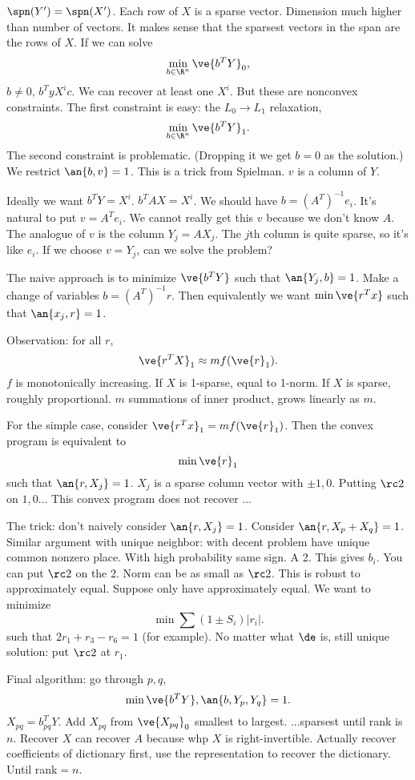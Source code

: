 $\spn(Y')=\spn(X')$. Each row of $X$ is a sparse vector.
Dimension much higher than number of vectors.
It makes sense that the sparsest vectors in the span are the rows of $X$. If we can solve
\[
\min_{b\in \R^n} \ve{b^TY}_0,
\]
$b\ne 0$, $b^Ty X^ic$. We can recover at least one $X^i$. But these are nonconvex constraints. The first constraint is easy: the $L_0\to L_1$ relaxation,
\[
\min_{b\in \R^n} \ve{b^TY}_1.
\]
The second constraint is problematic. (Dropping it we get $b=0$ as the solution.) We restrict $\an{b,v}=1$. This is a trick from Spielman. $v$ is a column of $Y$. 

Ideally we want $b^TY=X^i$. $b^TAX=X^i$. We should have $b=(A^T)^{-1} e_i$. It's natural to put $v=A^Te_i$.
We cannot really get this $v$ because we don't know $A$. The analogue of $v$ is the column $Y_j=A X_j$. The $j$th column is quite sparse, so it's like $e_i$. If we choose $v=Y_j$, can we solve the problem?

The naive approach is to minimize $\ve{b^T Y}$ such that $\an{Y_j,b}=1$. Make a change of variables $b=(A^T)^{-1}r$. Then equivalently we want $\min\ve{r^Tx}$ such that $\an{x_j,r}=1$.

Observation: for all $r$,
\[
\ve{r^TX}_1\approx mf(\ve{r}_1).
\]
$f$ is monotonically increasing. If $X$ is 1-sparse, equal to 1-norm. If $X$ is sparse, roughly proportional. $m$ summations of inner product, grows linearly as $m$.

For the simple case, consider $\ve{r^T x}_1  = mf(\ve{r}_1)$. Then the convex program is equivalent to 
\[
\min \ve{r}_1
\]
such that $\an{r,X_j}=1$. $X_j$ is a sparse column vector with $\pm 1,0$.
Putting $\rc2$ on $1,0$... This convex program does not recover ...

The trick: don't naively consider $\an{r,X_j}=1$. Consider $\an{r,X_p+X_q}=1$.
Similar argument with unique neighbor: with decent problem have unique common nonzero place. With high probability same sign. A 2. This gives $b_i$. You can put $\rc2$ on the $2$. Norm can be as small as $\rc2$. This is robust to approximately equal. Suppose only have approximately equal. 
We want to minimize
\[
\min \sum (1\pm S_i) |r_i|.
\]
such that $2r_1+r_3-r_6=1$ (for example). No matter what $\de$ is, still unique solution: put $\rc2$ at $r_1$. %

Final algorithm: go through $p,q$, 
\[
\min \ve{b^TY},\an{b,Y_p,Y_q}=1.
\]
$X_{pq}=b_{pq}^T Y$. Add $X_{pq}$ from $\ve{X_{pq}}_0$ smallest to largest.
...sparsest until rank is $n$.
Recover $X$ can recover $A$ because whp $X$ is right-invertible. 
Actually recover coefficients of dictionary first, use the representation to recover the dictionary. 
Until rank$=n$.

